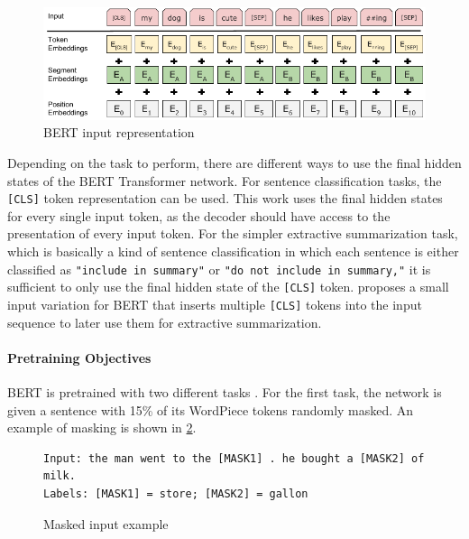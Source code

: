 \begin{figure}[h]
\centering
\includegraphics{figures/bert-input-representation}
\caption[BERT input representation]{BERT input representation \cite[p.~5]{devlin2018bert}}
\label{fig:bert-input-representation}
\end{figure}

Depending on the task to perform, there are different ways to use the final hidden states of the BERT Transformer network.
For sentence classification tasks, the \texttt{[CLS]} token representation can be used.
This work uses the final hidden states for every single input token, as the decoder should have access to the presentation of every input token.
For the simpler extractive summarization task, which is basically a kind of sentence classification in which each sentence is either classified as \texttt{"include in summary"} or \texttt{"do not include in summary,"} it is sufficient to only use the final hidden state of the \texttt{[CLS]} token. 
\cite{1903.10318} proposes a small input variation for BERT that inserts multiple \texttt{[CLS]} tokens into the input sequence to later use them for extractive summarization.

\paragraph{Pretraining Objectives}

BERT is pretrained with two different tasks \cite[p.~4--5]{devlin2018bert}.
For the first task, the network is given a sentence with 15\% of its WordPiece tokens randomly masked.
An example of masking is shown in \cref{fig:bert_masking_example}.

\begin{figure}[h]
\begin{lstlisting}[numbers=none]
Input: the man went to the [MASK1] . he bought a [MASK2] of milk.
Labels: [MASK1] = store; [MASK2] = gallon
\end{lstlisting}
\caption[Masked input example]{Masked input example \cite{bertGithub}}
\label{fig:bert_masking_example}
\end{figure}


